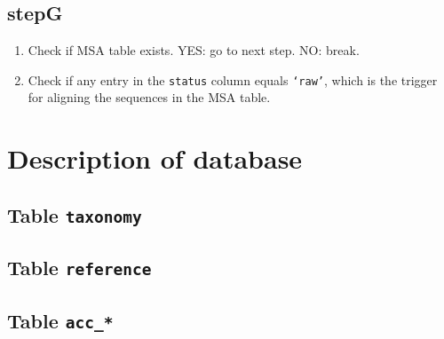 \documentclass[12pt]{article}
\begin{document}
\subsection{stepG}

\begin{enumerate}
\item Check if MSA table exists. YES: go to next step. NO: break.
\item Check if any entry in the \texttt{status} column equals \texttt{`raw'}, which is the trigger for aligning the sequences in the MSA table. 
\end{enumerate}

\section{Description of database}

\subsection{Table \texttt{taxonomy}}

\subsection{Table \texttt{reference}}

\subsection{Table \texttt{acc\_*}}
\end{document}
